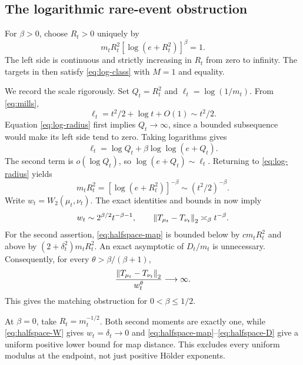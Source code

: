\documentclass[11pt]{article}
\numberwithin{equation}{section}
\theoremstyle{remark}\newtheorem{remark}[theorem]{Remark}
\begin{document}
\subsection{The logarithmic rare-event obstruction}
For $\beta>0$, choose $R_t>0$ uniquely by
\begin{equation}\label{eq:log-radius}
 m_tR_t^2[\log(e+R_t^2)]^\beta=1.
\end{equation}
The left side is continuous and strictly increasing in $R_t$ from zero to infinity. The targets in  then satisfy \eqref{eq:log-class} with $M=1$ and equality.

We record the scale rigorously. Set $Q_t=R_t^2$ and $\ell_t=\log(1/m_t)$. From \eqref{eq:mills},
\begin{equation}\label{eq:tail-log}
 \ell_t=t^2/2+\log t+O(1)\sim t^2/2.
\end{equation}
Equation \eqref{eq:log-radius} first implies $Q_t\to\infty$, since a bounded subsequence would make its left side tend to zero. Taking logarithms gives
\[
 \ell_t=\log Q_t+\beta\log\log(e+Q_t).
\]
The second term is $o(\log Q_t)$, so $\log(e+Q_t)\sim\ell_t$. Returning to \eqref{eq:log-radius} yields
\begin{equation}\label{eq:log-radius-scale}
 m_tR_t^2=[\log(e+R_t^2)]^{-\beta}\sim(t^2/2)^{-\beta}.
\end{equation}
Write $w_t=W_2(\mu_t,\nu_t)$. The exact identities and bounds in  now imply
\begin{equation}\label{eq:log-sharp-scales}
 w_t\sim2^{\beta/2}t^{-\beta-1},
 \qquad \left\lVert T_{\mu_t}-T_{\nu_t}\right\rVert_2\asymp_\beta t^{-\beta}.
\end{equation}
For the second assertion, \eqref{eq:halfspace-map} is bounded below by $cm_tR_t^2$ and above by $(2+\delta_t^2)m_tR_t^2$. An exact asymptotic of $D_t/m_t$ is unnecessary.
Consequently, for every $\theta>\beta/(\beta+1)$,
\[
 \frac{\left\lVert T_{\mu_t}-T_{\nu_t}\right\rVert_2}{w_t^\theta}
 \longrightarrow\infty.
\]
This gives the matching obstruction for $0<\beta\le1/2$.

At $\beta=0$, take $R_t=m_t^{-1/2}$. Both second moments are exactly one, while \eqref{eq:halfspace-W} gives $w_t=\delta_t\to0$ and \eqref{eq:halfspace-map}--\eqref{eq:halfspace-D} give a uniform positive lower bound for map distance. This excludes every uniform modulus at the endpoint, not just positive H\"older exponents.
\end{document}
